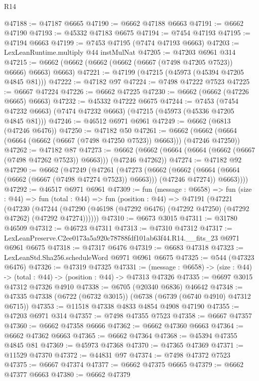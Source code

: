 \begin{lexlean}{R14}
\begin{coremodule}
@47188 := @47187 @6665
@47190 := @6662 @47188 @6663
@47191 := @6662 @47190
@47193 := @45332 @47183 @6675
@47194 := @7454 @47193
@47195 := @47194 @6663
@47199 := @7453 @47195 (@7474 @47193 @6663)
@47203 := LexLeanRuntime.multiply @44 instMulNat
@47205 := @47203 @6961 @314
@47215 := @6662 (@6662 (@6662 (@6662 (@6667 (@7498 @47205 @7523)) @6666) @6663) @6663)
@47221 := @47199 (@47215 (@45973 (@45394 @47205 @4845 @81)))
@47222 := @47182 @97
@47224 := @7498 @47222 @7523
@47225 := @6667 @47224
@47226 := @6662 @47225
@47230 := @6662 (@6662 (@47226 @6665) @6663)
@47232 := @45332 @47222 @6675
@47244 := @7453
    (@7454 @47232 @6663)
    (@7474 @47232 @6663)
    (@47215 (@45973 (@45336 @47205 @4845 @81)))
@47246 := @46512 @6971 @6961
@47249 := @6662 (@6813 (@47246 @6476))
@47250 := @47182 @50
@47261 := @6662 (@6662 (@6664 (@6664 (@6662 (@6667 (@7498 @47250 @7523)) @6663))) (@47246 @47250))
@47262 := @47182 @87
@47273 := @6662 (@6662 (@6664 (@6664 (@6662 (@6667 (@7498 @47262 @7523)) @6663))) (@47246 @47262))
@47274 := @47182 @92
@47290 := @6662
    (@47249
      (@47261
        (@47273
          (@6662
            (@6662 (@6664 (@6664 (@6662 (@6667 (@7498 @47274 @7523)) @6663))) (@47246 @47274))
            @6663))))
@47292 := @46517 @6971 @6961
@47309 := fun (message : @6658) =>
  fun (size : @44) =>
  fun (total : @44) =>
  fun (position : @44) =>
  @47191
    (@47221
      (@47230
        (@47244 (@47290 (@46198 (@47292 @6476) (@47292 @47250) (@47292 @47262) (@47292 @47274))))))
@47310 := @6673 @3015
@47311 := @31780 @46509
@47312 := @46723 @47311
@47313 := @47310 @47312
@47317 := LexLeanPreserve.C2ee0173a5a920c78788fdf101ab63f44.R14.__fits_23 @6971 @6961 @6675
@47318 := @47317 @6476
@47319 := @6683 @47318
@47323 := LexLeanStd.Sha256.scheduleWord @6971 @6961 @6675
@47325 := @544 (@47323 @6476)
@47326 := @47319 @47325
@47331 := (message : @6658) -> (size : @44) -> (total : @44) -> (position : @44) -> @47313 @47326
@47335 := @6697 @3015 @47312 @47326 @4910
@47338 := @6705 (@20340 @6836) @46642
@47348 := @47335 @47338 (@6722 (@6732 @3015)) (@6738 (@6739 (@6740 @4910) @47312 @6715))
@47353 := @11518 @47338 @4833 @4854 @4908 @47190
@47355 := @47203 @6971 @314
@47357 := @7498 @47355 @7523
@47358 := @6667 @47357
@47360 := @6662 @47358 @6666
@47362 := @6662 @47360 @6663
@47364 := @6662 @47362 @6663
@47365 := @6662 @47364
@47368 := @45394 @47355 @4845 @81
@47369 := @45973 @47368
@47370 := @47365 @47369
@47371 := @11529 @47370
@47372 := @44831 @97
@47374 := @7498 @47372 @7523
@47375 := @6667 @47374
@47377 := @6662 @47375 @6665
@47379 := @6662 @47377 @6663
@47380 := @6662 @47379

\end{coremodule}
\end{lexlean}
